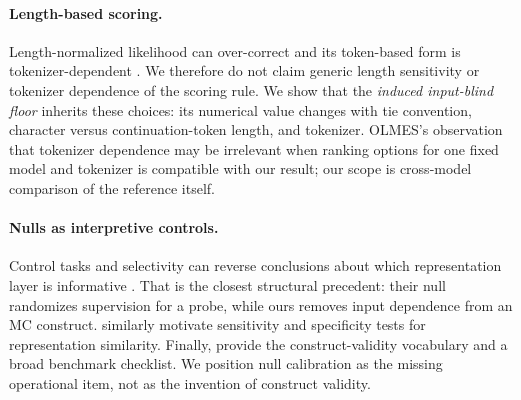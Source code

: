 \paragraph{Length-based scoring.}
Length-normalized likelihood can over-correct and its token-based form is tokenizer-dependent \citep{oostermeijer2026length}. We therefore do not claim generic length sensitivity or tokenizer dependence of the scoring rule. We show that the \emph{induced input-blind floor} inherits these choices: its numerical value changes with tie convention, character versus continuation-token length, and tokenizer. OLMES's observation that tokenizer dependence may be irrelevant when ranking options for one fixed model and tokenizer is compatible with our result; our scope is cross-model comparison of the reference itself.

\paragraph{Nulls as interpretive controls.}
Control tasks and selectivity can reverse conclusions about which representation layer is informative \citep{hewitt2019probes}. That is the closest structural precedent: their null randomizes supervision for a probe, while ours removes input dependence from an MC construct. \citet{ding2021grounding} similarly motivate sensitivity and specificity tests for representation similarity. Finally, \citet{bean2025measuring} provide the construct-validity vocabulary and a broad benchmark checklist. We position null calibration as the missing operational item, not as the invention of construct validity.
